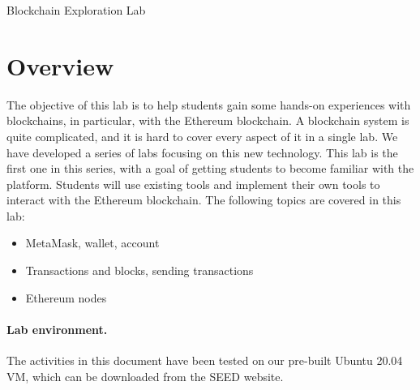 
\newcommand{\commonfolder}{../../common-files}







\begin{center}
{\LARGE Blockchain Exploration Lab}
\end{center}




\section{Overview}

The objective of this lab is to help students gain some hands-on experiences
with blockchains, in particular, with the Ethereum blockchain. 
A blockchain system is quite complicated, and it is hard to cover every aspect
of it in a single lab. We have developed a series of labs focusing 
on this new technology. This lab is the first one in this 
series, with a goal of getting students to become familiar with the platform. 
Students will use existing tools and implement their own tools
to interact with the Ethereum blockchain. 
The following topics are covered in this lab:

\begin{itemize}[noitemsep]
\item MetaMask, wallet, account 
\item Transactions and blocks, sending transactions 
\item Ethereum nodes 
\end{itemize}


\paragraph{Lab environment.} The activities in this document 
have been tested on our pre-built
Ubuntu 20.04 VM, which can be downloaded from the SEED website.  


